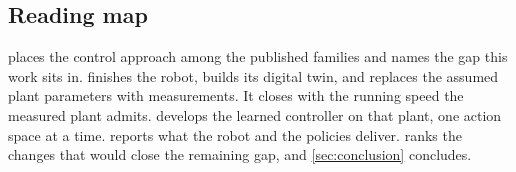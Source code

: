 \subsection{Reading map}
\label{sec:intro-map}

 places the control approach among the published families and names the gap this work sits in.
 finishes the robot, builds its digital twin, and replaces the assumed plant parameters with measurements. It closes with the running speed the measured plant admits.
 develops the learned controller on that plant, one action space at a time.
 reports what the robot and the policies deliver.
 ranks the changes that would close the remaining gap, and \cref{sec:conclusion} concludes.
